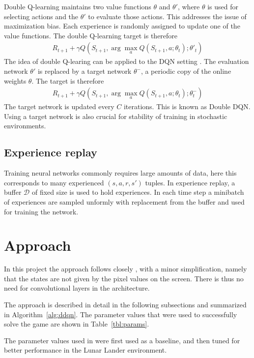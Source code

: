 \documentclass{article}
\begin{document}
Double Q-learning maintains two value functions $\theta$ and $\theta'$, where $\theta$ is used for selecting actions and the $\theta'$ to evaluate those actions. This addresses the issue of maximization bias. Each experience is randomly assigned to update one of the value functions. The double Q-learning target is therefore
\begin{align*}
  R_{t+1} + \gamma Q(S_{t+1}, \arg \max_a Q(S_{t+1}, a; \theta_t); \theta'_t)
\end{align*}
The idea of double Q-learing can be applied to the DQN setting \cite{Hasselt2016DeepRL}. The evaluation network $\theta'$ is replaced by a target network $\theta^{-}$, a periodic copy of the online weights $\theta$. The target is therefore
\begin{align*}
  R_{t+1} + \gamma Q(S_{t+1}, \arg \max_a Q(S_{t+1}, a; \theta_t); \theta_t^{-})
\end{align*}
The target network is updated every $C$ iterations. This is known as Double DQN. Using a target network is also crucial for stability of training in stochastic environments.

\subsection{Experience replay}
Training neural networks commonly requires large amounts of data, here this corresponds to many experienced $(s,a,r,s')$ tuples. In experience replay, a buffer $\mathcal{D}$ of fixed size is used to hold experiences. In each time step a minibatch of experiences are sampled unformly with replacement from the buffer and used for training the network.

\section{Approach}
\label{approach}
In this project the approach follows closely \cite{Mnih2013PlayingAW}, with a minor simplification, namely that the states are not given by the pixel values on the screen. There is thus no need for convolutional layers in the architecture.

The approach is described in detail in the following subsections and summarized in Algorithm~\ref{alg:ddqn}. The parameter values that were used to successfully solve the game are shown in Table~\ref{tbl:params}.

The parameter values used in \cite{mnih2015humanlevel} were first used as a baseline, and then tuned for better performance in the Lunar Lander environment.
\end{document}
